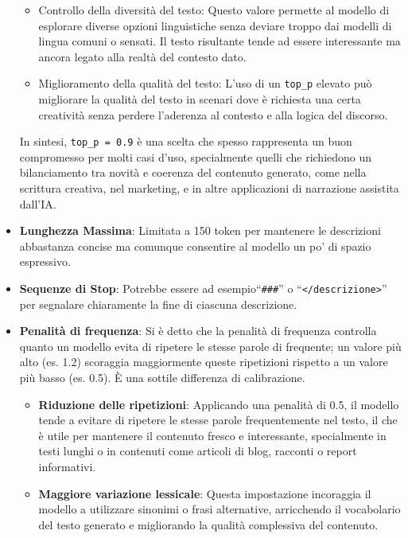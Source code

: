 \begin{itemize}
\begin{itemize}
                \item Controllo della diversità del testo: Questo valore permette al modello di esplorare diverse opzioni linguistiche senza deviare troppo dai modelli di lingua comuni o sensati. Il testo risultante tende ad essere interessante ma ancora legato alla realtà del contesto dato.
                \item Miglioramento della qualità del testo: L'uso di un \texttt{top\_p} elevato può migliorare la qualità del testo in scenari dove è richiesta una certa creatività senza perdere l'aderenza al contesto e alla logica del discorso.
            \end{itemize}
        
            In sintesi, \texttt{top\_p = 0.9} è una scelta che spesso rappresenta un buon compromesso per molti casi d'uso, specialmente quelli che richiedono un bilanciamento tra novità e coerenza del contenuto generato, come nella scrittura creativa, nel marketing, e in altre applicazioni di narrazione assistita dall'IA.
        
        \item
            \textbf{Lunghezza Massima}: Limitata a 150 token per mantenere le descrizioni abbastanza concise ma comunque consentire al modello un po’ di spazio espressivo.
        
        \item
            \textbf{Sequenze di Stop}: Potrebbe essere ad esempio``\texttt{\#\#\#}'' o ``\texttt{</descrizione>}'' per segnalare chiaramente la fine di ciascuna descrizione.
        
        \item
            \textbf{Penalità di frequenza}: Si è detto che la penalità di frequenza controlla quanto un modello evita di ripetere le stesse parole di frequente; un valore più alto (es. 1.2) scoraggia maggiormente queste ripetizioni rispetto a un valore più basso (es. 0.5). È una sottile differenza di calibrazione.
            \begin{itemize}
                \item \textbf{Riduzione delle ripetizioni}: Applicando una penalità di 0.5, il modello tende a evitare di ripetere le stesse parole frequentemente nel testo, il che è utile per mantenere il contenuto fresco e interessante, specialmente in testi lunghi o in contenuti come articoli di blog, racconti o report informativi.
                
                \item \textbf{Maggiore variazione lessicale}: Questa impostazione incoraggia il modello a utilizzare sinonimi o frasi alternative, arricchendo il vocabolario del testo generato e migliorando la qualità complessiva del contenuto.
                

\end{itemize}
\end{itemize}
